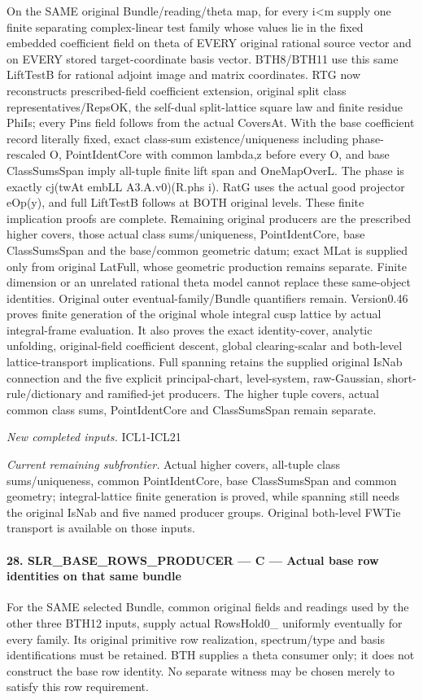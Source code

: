 On the SAME original Bundle/reading/theta map, for every i<m supply one finite separating complex-linear test family whose values lie in the fixed embedded coefficient field on theta of EVERY original rational source vector and on EVERY stored target-coordinate basis vector. BTH8/BTH11 use this same LiftTestB for rational adjoint image and matrix coordinates. RTG now reconstructs prescribed-field coefficient extension, original split class representatives/RepsOK, the self-dual split-lattice square law and finite residue PhiIs; every Pins field follows from the actual CoversAt. With the base coefficient record literally fixed, exact class-sum existence/uniqueness including phase-rescaled O, PointIdentCore with common lambda,z before every O, and base ClassSumsSpan imply all-tuple finite lift span and OneMapOverL. The phase is exactly cj(twAt embLL A3.A.v0)(R.phs i). RatG uses the actual good projector eOp(y), and full LiftTestB follows at BOTH original levels. These finite implication proofs are complete. Remaining original producers are the prescribed higher covers, those actual class sums/uniqueness, PointIdentCore, base ClassSumsSpan and the base/common geometric datum; exact MLat is supplied only from original LatFull, whose geometric production remains separate. Finite dimension or an unrelated rational theta model cannot replace these same-object identities. Original outer eventual-family/Bundle quantifiers remain. Version0.46 proves finite generation of the original whole integral cusp lattice by actual integral-frame evaluation. It also proves the exact identity-cover, analytic unfolding, original-field coefficient descent, global clearing-scalar and both-level lattice-transport implications. Full spanning retains the supplied original IsNab connection and the five explicit principal-chart, level-system, raw-Gaussian, short-rule/dictionary and ramified-jet producers. The higher tuple covers, actual common class sums, PointIdentCore and ClassSumsSpan remain separate.

\emph{New completed inputs.} ICL1-ICL21

\emph{Current remaining subfrontier.} Actual higher covers, all-tuple class sums/uniqueness, common PointIdentCore, base ClassSumsSpan and common geometry; integral-lattice finite generation is proved, while spanning still needs the original IsNab and five named producer groups. Original both-level FWTie transport is available on those inputs.



\paragraph{28. SLR\_\allowbreak BASE\_\allowbreak ROWS\_\allowbreak PRODUCER — C — Actual base row identities on that same bundle}

For the SAME selected Bundle, common original fields and readings used by the other three BTH12 inputs, supply actual RowsHold0\_ uniformly eventually for every family. Its original primitive row realization, spectrum/type and basis identifications must be retained. BTH supplies a theta consumer only; it does not construct the base row identity. No separate witness may be chosen merely to satisfy this row requirement.


